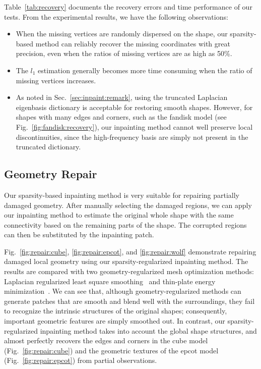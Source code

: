 Table~\ref{tab:recovery} documents
the recovery errors and time performance of our tests. From the experimental results, we have the following
observations:

\begin{itemize}
  \item When the missing vertices are randomly dispersed on the shape, our
        sparsity-based method can reliably recover the missing coordinates
        with great precision, even when the ratios of missing vertices are
        as high as 50\%.
  \item The $l_1$ estimation generally becomes more time consuming when the
        ratio of missing vertices increases.
  \item As noted in Sec.~\ref{sec:inpaint:remark}, using the truncated Laplacian
        eigenbasis dictionary is acceptable for restoring smooth shapes.
        However, for shapes with many edges and corners, such as the fandisk
        model (see Fig.~\ref{fig:fandisk:recovery}), our inpainting method
        cannot well preserve local discontinuities, since the high-frequency
        basis are simply not present in the truncated dictionary.
\end{itemize}

\subsection{Geometry Repair}
Our sparsity-based inpainting method is very suitable for repairing partially
damaged geometry. After manually selecting the damaged regions, we can apply
our inpainting method to estimate the original whole shape with the same
connectivity based on the remaining parts of the shape. The corrupted regions
can then be substituted by the inpainting patch.

Fig.~\ref{fig:repair:cube}, \ref{fig:repair:epcot}, and \ref{fig:repair:wolf}
demonstrate repairing damaged local geometry using our sparsity-regularized
inpainting method. The results are compared with two geometry-regularized mesh
optimization methods: Laplacian regularized least square
smoothing~\cite{Nealen2006} and thin-plate energy minimization~\cite{Bac2008}.
We can see that, although geometry-regularized methods can generate patches
that are smooth and blend well with the surroundings, they fail to recognize
the intrinsic structures of the original shapes; consequently, important
geometric features are simply smoothed out. In contrast, our
sparsity-regularized inpainting method takes into account the global shape
structures, and almost perfectly recovers the edges and corners in the cube
model (Fig.~\ref{fig:repair:cube}) and the geometric textures of the epcot
model (Fig.~\ref{fig:repair:epcot}) from partial observations.


